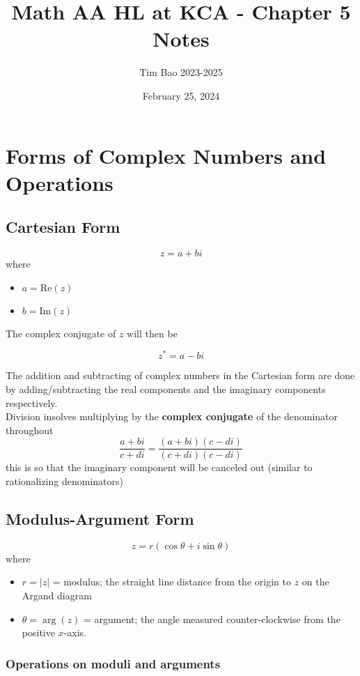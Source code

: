 \documentclass[11pt]{article}
\title{Math AA HL at KCA - Chapter 5 Notes}
\author{Tim Bao 2023-2025}
\date{February 25, 2024}
\newcommand{\lb}{\\[8pt]}
\begin{document}
\maketitle
\pagebreak
\tableofcontents
\pagebreak

\section{Forms of Complex Numbers and Operations}

\subsection{Cartesian Form}

$$z = a + bi$$
where
\begin{itemize}
  \item $a = \text{Re}{(z)}$
  \item $b = \text{Im}{(z)}$
\end{itemize}

\noindent The complex conjugate of $z$ will then be

$$z^* = a - bi$$

\noindent The addition and subtracting of complex numbers in the Cartesian form are done by adding/subtracting the real components and the imaginary components respectively.\lb
Division insolves multiplying by the \textbf{complex conjugate} of the denominator throughout
$$\frac{a + bi}{c + di} = \frac{(a + bi)(c - di)}{(c + di)(c - di)}$$ this is so that the imaginary component will be canceled out (similar to rationalizing denominators)

\pagebreak

\subsection{Modulus-Argument Form}

$$z = r\left(\cos\theta + i\sin\theta\right)$$
where
\begin{itemize}
  \item $r = |z|$ = modulus; the straight line distance from the origin to $z$ on the Argand diagram
  \item $\theta = \arg(z)$ = argument; the angle measured counter-clockwise from the positive $x$-axis.
\end{itemize}

\subsubsection*{Operations on moduli and arguments}
\end{document}
